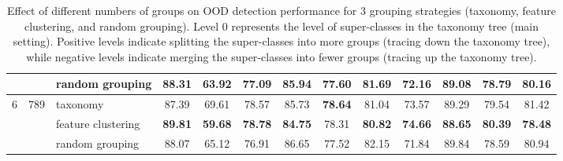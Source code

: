 \documentclass[final]{cvpr}
\begin{document}
\begin{table*}[t]
{\begin{tabular}{c|c|l|cc|cc|cc|cc|cc}
                                &                                                                                        & random grouping                                                                                             & 88.31                & 63.92                 & 77.09                & 85.94                 & 77.60                & 81.69                 & 72.16                & 89.08                 & 78.79                & 80.16                \\ \midrule
\multirow{3}{*}{6}              & \multirow{3}{*}{789}                                                                   & taxonomy                                                                                                    & 87.39                & 69.61                 & 78.57                & 85.73                 & \textbf{78.64}       & 81.04                 & 73.57                & 89.29                 & 79.54                & 81.42                \\
                                &                                                                                        & feature clustering                                                                                          & \textbf{89.81}       & \textbf{59.68}        & \textbf{78.78}       & \textbf{84.75}        & 78.31                & \textbf{80.82}        & \textbf{74.66}       & \textbf{88.65}        & \textbf{80.39}       & \textbf{78.48}       \\
                                &                                                                                        & random grouping                                                                                             & 88.07                & 65.12                 & 76.91                & 86.65                 & 77.52                & 82.15                 & 71.84                & 89.84                 & 78.59                & 80.94                \\ \bottomrule
\end{tabular}
}
\caption{\small{Effect of different numbers of groups on OOD detection performance for 3 grouping strategies (taxonomy, feature clustering, and random grouping). Level 0 represents the level of super-classes in the taxonomy tree (main setting). Positive levels indicate splitting the super-classes into more groups (tracing down the taxonomy tree), while negative levels indicate merging the super-classes into fewer groups (tracing up the taxonomy tree).}}
\label{table:group_number_ablation}
\vspace{-0.4cm}
\end{table*}
\end{document}
